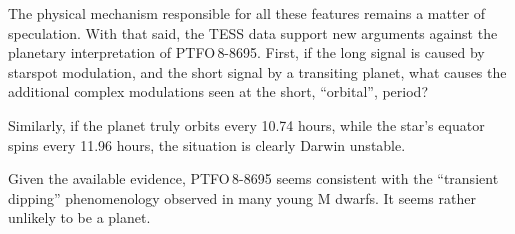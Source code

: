 \documentclass[12pt,twocolumn,tighten]{aastex62}
\newcommand{\ptfo}{PTFO$\,$8-8695}
\begin{document}
The physical mechanism responsible for all these features remains a
matter of speculation.
With that said, the TESS data support new arguments against the planetary
interpretation of \ptfo.
First, if the long signal is caused by starspot modulation, and the
short signal by a transiting planet, what causes the additional
complex modulations seen at the short, ``orbital'', period?

Similarly, if the planet truly orbits every 10.74 hours, while the
star's equator spins every 11.96 hours, the situation is clearly
Darwin unstable. 



  Given the available evidence,
  PTFO$\,$8-8695 seems consistent with the
  ``transient dipping'' phenomenology observed in many young M dwarfs.
  It seems rather unlikely to be a planet.



\end{document}
